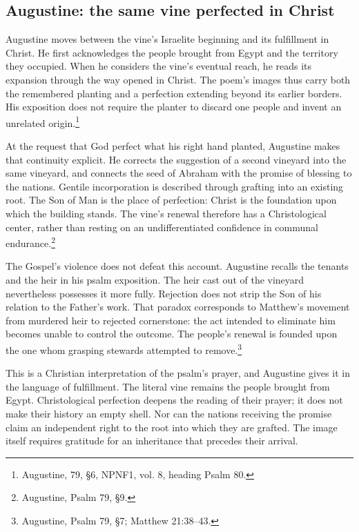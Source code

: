 \subsection{Augustine: the same vine perfected in Christ}
Augustine moves between the vine's Israelite beginning and its fulfillment in Christ. He first acknowledges the people brought from Egypt and the territory they occupied. When he considers the vine's eventual reach, he reads its expansion through the way opened in Christ. The poem's images thus carry both the remembered planting and a perfection extending beyond its earlier borders. His exposition does not require the planter to discard one people and invent an unrelated origin.\footnote{Augustine,  79, §6, NPNF1, vol. 8, heading Psalm 80.}

At the request that God perfect what his right hand planted, Augustine makes that continuity explicit. He corrects the suggestion of a second vineyard into the same vineyard, and connects the seed of Abraham with the promise of blessing to the nations. Gentile incorporation is described through grafting into an existing root. The Son of Man is the place of perfection: Christ is the foundation upon which the building stands. The vine's renewal therefore has a Christological center, rather than resting on an undifferentiated confidence in communal endurance.\footnote{Augustine, Psalm 79, §9.}

The Gospel's violence does not defeat this account. Augustine recalls the tenants and the heir in his psalm exposition. The heir cast out of the vineyard nevertheless possesses it more fully. Rejection does not strip the Son of his relation to the Father's work. That paradox corresponds to Matthew's movement from murdered heir to rejected cornerstone: the act intended to eliminate him becomes unable to control the outcome. The people's renewal is founded upon the one whom grasping stewards attempted to remove.\footnote{Augustine, Psalm 79, §7; Matthew 21:38--43.}

This is a Christian interpretation of the psalm's prayer, and Augustine gives it in the language of fulfillment. The literal vine remains the people brought from Egypt. Christological perfection deepens the reading of their prayer; it does not make their history an empty shell. Nor can the nations receiving the promise claim an independent right to the root into which they are grafted. The image itself requires gratitude for an inheritance that precedes their arrival.

